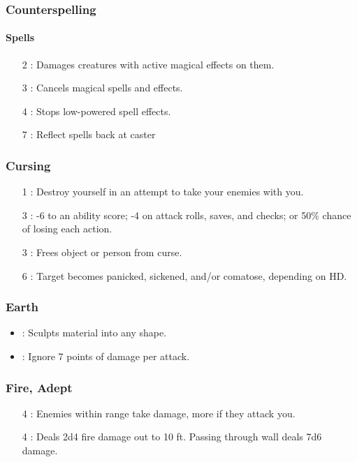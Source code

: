 \subsubsection{Counterspelling}
\label{Spec:Counterspelling}
\paragraph{Spells}
\begin{itemize}
 \item[2] : Damages creatures with active magical effects on them.
 \item[3] : Cancels magical spells and effects.
 \item[4] : Stops low-powered spell effects.
 \item[7] : Reflect spells back at caster
\end{itemize}


\subsubsection{Cursing}
\begin{itemize}
 \item[1] : Destroy yourself in an attempt to take your enemies with you.
 \item[3] : -6 to an ability score; -4 on attack rolls, saves, and checks; or 50\% chance of losing each action.
 \item[3] : Frees object or person from curse.
 \item[6] : Target becomes panicked, sickened, and/or comatose, depending on HD.
\end{itemize}

\subsubsection{Earth}
\begin{itemize}
 \item {}: Sculpts material into any shape.
 \item {}: Ignore 7 points of damage per attack.
\end{itemize}


\subsubsection{Fire, Adept}
\begin{itemize}
 \item[4] : Enemies within range take damage, more if they attack you.
 \item[4] : Deals 2d4 fire damage out to 10 ft. Passing through wall deals 7d6 damage.
\end{itemize}

